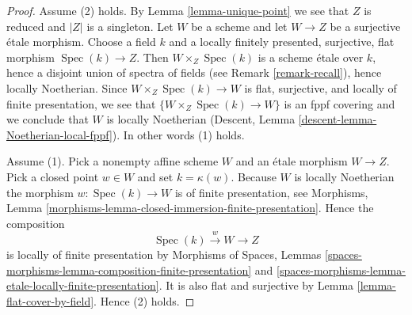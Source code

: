 \documentclass{stacks-project}
\theoremstyle{plain}
\theoremstyle{definition}
\theoremstyle{remark}
\numberwithin{equation}{subsection}
\def\Spec{\mathop{\mathrm{Spec}}}
\begin{document}
\begin{proof}
Assume (2) holds. By
Lemma \ref{lemma-unique-point}
we see that $Z$ is reduced and $|Z|$ is a singleton.
Let $W$ be a scheme and let $W \to Z$ be a surjective \'etale
morphism. Choose a field $k$ and a locally finitely presented, surjective,
flat morphism $\Spec(k) \to Z$.
Then $W \times_Z \Spec(k)$ is a scheme
\'etale over $k$, hence a disjoint union of spectra of fields
(see Remark \ref{remark-recall}),
hence locally Noetherian. Since $W \times_Z \Spec(k) \to W$
is flat, surjective, and locally of finite presentation, we see
that $\{W \times_Z \Spec(k) \to W\}$ is an fppf covering
and we conclude that $W$ is locally Noetherian
(Descent, Lemma
\ref{descent-lemma-Noetherian-local-fppf}).
In other words (1) holds.

\medskip\noindent
Assume (1). Pick a nonempty affine scheme $W$ and an \'etale morphism
$W \to Z$. Pick a closed point $w \in W$ and set
$k = \kappa(w)$. Because $W$ is locally Noetherian the morphism
$w : \Spec(k) \to W$ is of finite presentation, see
Morphisms, Lemma \ref{morphisms-lemma-closed-immersion-finite-presentation}.
Hence the composition
$$
\Spec(k) \xrightarrow{w} W \longrightarrow Z
$$
is locally of finite presentation by
Morphisms of Spaces, Lemmas
\ref{spaces-morphisms-lemma-composition-finite-presentation} and
\ref{spaces-morphisms-lemma-etale-locally-finite-presentation}.
It is also flat and surjective by
Lemma \ref{lemma-flat-cover-by-field}.
Hence (2) holds.
\end{proof}
\end{document}
